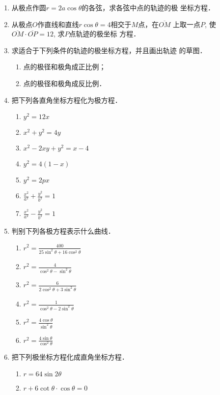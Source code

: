\begin{enumerate}
    \item 从极点作圆$r=2a\cos\theta$的各弦，求各弦中点的轨迹的极
    坐标方程．
    \item 从极点$O$作直线和直线$r\cos\theta=4$相交于$M$点，在$\overline{OM}$
    上取一点$P$, 使$\overline{OM}\cdot\overline{OP}=12$, 求$P$点轨迹的极坐标
    方程．
    \item 求适合于下列条件的轨迹的极坐标方程，并且画出轨迹
    的草图．
\begin{enumerate}
    \item 点的极径和极角成正比例；
    \item 点的极径和极角成反比例．
\end{enumerate}
\item 把下列各直角坐标方程化为极方程．
\begin{multicols}{2}
\begin{enumerate}
    \item $y^2=12x$
    \item $x^2+y^2=4y$
    \item $x^2-2xy+y^2=x-4$
    \item $y^2=4(1-x)$
    \item $y^2=2px$
    \item $\frac{x^2}{a^2}+\frac{y^2}{b^2}=1$
    \item $\frac{x^2}{a^2}-\frac{y^2}{b^2}=1$
\end{enumerate}
\end{multicols}
\item 判别下列各极方程表示什么曲线．
\begin{multicols}{2}
    \begin{enumerate}
    \item $r^2=\frac{400}{25\sin^2\theta+16\cos^2\theta}$
    \item $r^2=\frac{4}{\cos^2\theta-\sin^2\theta}$
    \item $r^2=\frac{6}{2\cos^2\theta+3\sin^2\theta}$
    \item $r^2=\frac{1}{\cos^2\theta-2\sin^2\theta}$
    \item $r^2=\frac{4\cos\theta}{\sin^2\theta}$
    \item $r^2=\frac{4\sin\theta}{\cos^2\theta}$
\end{enumerate}
\end{multicols}

\item 把下列极坐标方程化成直角坐标方程．
\begin{multicols}{2}
\begin{enumerate}
    \item $r=64\sin2\theta$
    \item $r+6\cot\theta\cdot \cos\theta=0$
\end{enumerate}
\end{multicols}

\end{enumerate}


